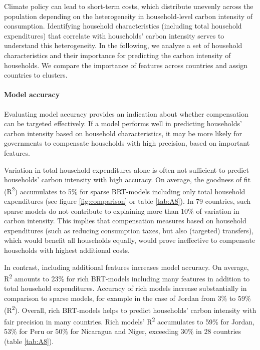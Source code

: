 \documentclass[12pt, a4paper]{article}
\begin{document}
Climate policy can lead to short-term costs, which distribute unevenly across the population depending on the heterogeneity in household-level carbon intensity of consumption. Identifying household characteristics (including total household expenditures) that correlate with households' carbon intensity serves to understand this heterogeneity. In the following, we analyze a set of household characteristics and their importance for predicting the carbon intensity of households. We compare the importance of features across countries and assign countries to clusters.

\paragraph{Model accuracy} 
Evaluating model accuracy provides an indication about whether compensation can be targeted effectively. If a model performs well in predicting households' carbon intensity based on household characteristics, it may be more likely for governments to compensate households with high precision, based on important features. 

Variation in total household expenditures alone is often not sufficient to predict households' carbon intensity with high accuracy. On average, the goodness of fit (R\textsuperscript{2}) accumulates to 5\% for sparse BRT-models including only total household expenditures (see figure \ref{fig:comparison} or table \ref{tab:A8}). In 79 countries, such sparse models do not contribute to explaining more than 10\% of variation in carbon intensity. This implies that compensation measures based on household expenditures (such as reducing consumption taxes, but also (targeted) transfers), which would benefit all households equally, would prove ineffective to compensate households with highest additional costs.

In contrast, including additional features increases model accuracy. On average, R\textsuperscript{2} amounts to 23\% for rich BRT-models including many features in addition to total household expenditures. Accuracy of rich models increase substantially in comparison to sparse models, for example in the case of Jordan from 3\% to 59\% (R\textsuperscript{2}). Overall, rich BRT-models helps to predict households' carbon intensity with fair precision in many countries. Rich models' R\textsuperscript{2} accumulates to 59\% for Jordan, 53\% for Peru or 50\% for Nicaragua and Niger, exceeding 30\% in 28 countries (table \ref{tab:A8}).
\end{document}
